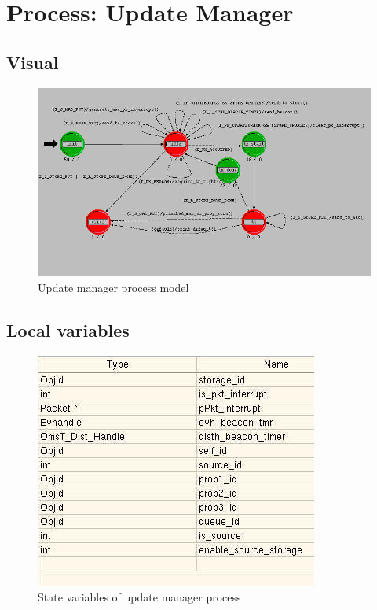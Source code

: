 
\section{Process: Update Manager}

\subsection{Visual}
\begin{figure}[ht]
    \centering
    \includegraphics[width=.7\textwidth]{images/p_update_manager}
    \caption{Update manager process model}
    \label{fig:appendix-c}
\end{figure}

\subsection{Local variables}
\begin{figure}[ht]
    \centering
    \includegraphics[width=.7\textwidth]{images/state_variable_update_manager}
    \caption{State variables of update manager process}
    \label{fig:appendix-c_sv}
\end{figure}

